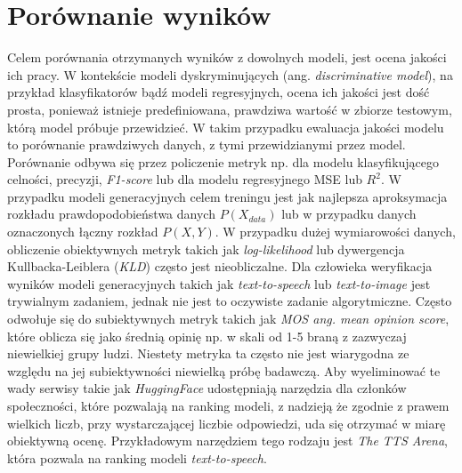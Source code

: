 \documentclass[data-science]{agh-wi} %
\begin{document}
\section{Porównanie wyników}
Celem porównania otrzymanych wyników z dowolnych modeli, jest ocena jakości ich pracy. W kontekście modeli dyskryminujących (ang. \textit{discriminative model}), na przykład klasyfikatorów bądź modeli regresyjnych, ocena ich jakości jest dość prosta, ponieważ istnieje predefiniowana, prawdziwa wartość w zbiorze testowym, którą model próbuje przewidzieć. W takim przypadku ewaluacja jakości modelu to porównanie prawdziwych danych, z tymi przewidzianymi przez model. Porównanie odbywa się przez policzenie metryk np. dla modelu klasyfikującego celności, precyzji, \textit{F1-score} lub dla modelu regresyjnego MSE lub $R^2$. W przypadku modeli generacyjnych celem treningu jest jak najlepsza aproksymacja rozkładu prawdopodobieństwa danych $P(X_{data})$ lub w przypadku danych oznaczonych łączny rozkład $P(X, Y)$. W przypadku dużej wymiarowości danych, obliczenie obiektywnych metryk takich jak \textit{log-likelihood} lub dywergencja Kullbacka-Leiblera (\textit{KLD}) często jest nieobliczalne. Dla człowieka weryfikacja wyników modeli generacyjnych takich jak \textit{text-to-speech} lub \textit{text-to-image} jest trywialnym zadaniem, jednak nie jest to oczywiste zadanie algorytmiczne. Często odwołuje się do subiektywnych metryk takich jak \textit{MOS ang. mean opinion score}, które oblicza się jako średnią opinię np. w skali od 1-5 braną z zazwyczaj niewielkiej grupy ludzi. Niestety metryka ta często nie jest wiarygodna ze względu na jej subiektywności niewielką próbę badawczą. Aby wyeliminować te wady serwisy takie jak \textit{HuggingFace} udostępniają narzędzia dla członków społeczności, które pozwalają na ranking modeli, z nadzieją że zgodnie z prawem wielkich liczb, przy wystarczającej liczbie odpowiedzi, uda się otrzymać w miarę obiektywną ocenę. Przykładowym narzędziem tego rodzaju jest \textit{The TTS Arena}\cite{tts_arena}, która pozwala na ranking modeli \textit{text-to-speech}.
\end{document}
